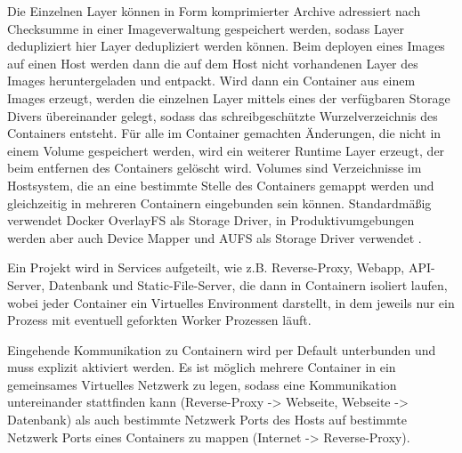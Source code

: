 Die Einzelnen Layer können in Form komprimierter Archive adressiert nach
Checksumme in einer Imageverwaltung gespeichert werden, sodass Layer
dedupliziert hier Layer dedupliziert werden können. Beim deployen  eines Images
auf einen Host werden dann die auf dem Host nicht vorhandenen Layer des Images
heruntergeladen und entpackt. Wird dann ein Container aus einem Images erzeugt,
werden die einzelnen Layer mittels eines der verfügbaren Storage Divers
übereinander gelegt, sodass das schreibgeschützte Wurzelverzeichnis des
Containers entsteht. Für alle im Container gemachten Änderungen, die nicht in
einem Volume gespeichert werden, wird ein weiterer Runtime Layer erzeugt, der
beim entfernen des Containers gelöscht wird. Volumes sind Verzeichnisse im
Hostsystem, die an eine bestimmte Stelle des Containers gemappt werden und
gleichzeitig in mehreren Containern eingebunden sein können. Standardmäßig
verwendet Docker OverlayFS als Storage Driver, in Produktivumgebungen werden
aber auch Device Mapper und AUFS als Storage Driver verwendet
\cite{docker-storage-driver}.


Ein Projekt wird in Services aufgeteilt, wie z.B. Reverse-Proxy, Webapp,
API-Server, Datenbank und Static-File-Server, die dann in Containern isoliert
laufen, wobei jeder Container ein Virtuelles Environment darstellt, in dem 
jeweils nur ein Prozess mit eventuell geforkten Worker Prozessen läuft.


\begin{figure}
  \centering
  \def\svgwidth{\columnwidth / 2}
  
\end{figure}

Eingehende Kommunikation zu Containern wird per Default unterbunden und muss
explizit aktiviert werden. Es ist möglich mehrere Container in ein
gemeinsames Virtuelles Netzwerk zu legen, sodass eine Kommunikation
untereinander stattfinden kann (Reverse-Proxy -> Webseite, Webseite ->
Datenbank) als auch bestimmte Netzwerk Ports des Hosts auf bestimmte Netzwerk
Ports eines Containers zu mappen (Internet -> Reverse-Proxy).

\begin{figure}
  \centering
  \def\svgwidth{\columnwidth}
  
\end{figure}


